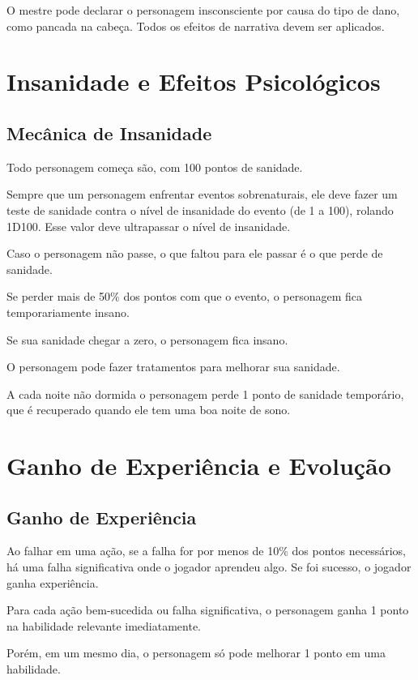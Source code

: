 \documentclass[a4paper,12pt]{book}
\begin{document}
O mestre pode declarar o personagem insconsciente por causa do tipo de dano, como pancada na cabeça. Todos os efeitos de narrativa devem ser aplicados.

\chapter{Insanidade e Efeitos Psicológicos}

\section{Mecânica de Insanidade}

Todo personagem começa são, com 100 pontos de sanidade.

Sempre que um personagem enfrentar eventos sobrenaturais, ele deve fazer um teste de sanidade contra o nível de insanidade do evento (de 1 a 100), rolando 1D100. Esse valor deve ultrapassar o nível de insanidade.

Caso o personagem não passe, o que faltou para ele passar é o que perde de sanidade.



Se perder mais de 50\% dos pontos com que o evento, o personagem fica temporariamente insano.

Se sua sanidade chegar a zero, o personagem fica insano.

O personagem pode fazer tratamentos para melhorar sua sanidade.

A cada noite não dormida o personagem perde 1 ponto de sanidade temporário, que é recuperado quando ele tem uma boa noite de sono.


\chapter{Ganho de Experiência e Evolução}

\section{Ganho de Experiência}

Ao falhar em uma ação, se a falha for por menos de 10\%  dos pontos necessários, há uma falha significativa onde o jogador aprendeu algo. Se foi sucesso, o jogador ganha experiência.

Para cada ação bem-sucedida ou falha significativa, o personagem ganha 1 ponto  na habilidade relevante imediatamente.

Porém, em um mesmo dia, o personagem só pode melhorar 1 ponto em uma habilidade.
\end{document}
